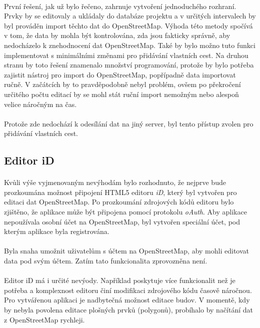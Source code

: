 \documentclass[11pt,a4paper,titlepage,oneside]{book}
\begin{document}
				\paragraph{} První řešení, jak už bylo řečeno, zahrnuje vytvoření jednoduchého rozhraní. Prvky by se editovaly a  ukládaly do databáze projektu a v určitých intervalech by byl prováděn import těchto dat do OpenStreetMap. Výhoda této metody spočívá v tom, že data by mohla být kontrolována, zda jsou fakticky správně, aby nedocházelo k znehodnocení dat OpenStreetMap. Také by bylo možno tuto funkci implementovat s minimálními změnami pro přidávání vlastních cest. Na druhou stranu by toto řešení znamenalo množství programování, protože by bylo potřeba zajistit nástroj pro import do OpenStreetMap, popřípadně data importovat ručně. V začátcích by to pravdě\-podobně nebyl problém, ovšem po překročení určitého počtu editací by se mohl stát ruční import nemožným nebo alespoň velice náročným na čas.
				\paragraph{} Protože zde nedochází k odesílání dat na jiný server, byl tento přístup zvolen pro přidávání vlastních cest.
			\subsection{Editor iD} 
				\paragraph{} Kvůli výše vyjmenovaným nevýhodám bylo rozhodnuto, že nejprve bude prozkoumána možnost připojení HTML5 editoru \textit{iD}, který byl vytvořen pro editaci dat OpenStreetMap. Po prozkoumání zdrojových kódů editoru bylo zjištěno, že aplikace může být připojena pomocí protokolu \textit{oAuth}. Aby aplikace nepoužívala osobní účet na OpenStreetMap, byl vytvořen speciální účet, pod kterým aplikace byla registrována. 


				\paragraph{}{\Large Byla snaha umožnit uživatelům s účtem na OpenStreetMap, aby mohli editovat data pod svým účtem. Zatím tato funkcionalita zprovozněna není.}
				\paragraph{} Editor iD má i určité nevýody. Například poskytuje více funkcionalit než je potřeba a komplexnost editoru činí modifikaci zdrojového kódu časově náročnou. Pro vytvářenou aplikaci je nadbytečná možnost editace budov. V momentě, kdy by nebyla povolena editace plošných prvků (polygonů), probíhalo by načítání dat z OpenStreetMap rychleji. 
\end{document}
